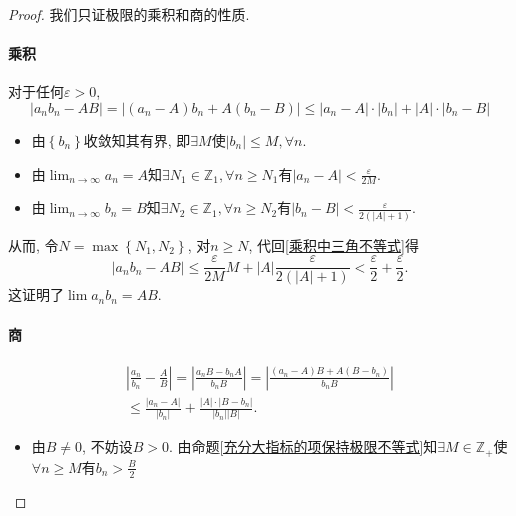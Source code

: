 \begin{proof}
    我们只证极限的乘积和商的性质.
    \paragraph{乘积}
    对于任何$\varepsilon > 0$, 
    \begin{equation}\label{乘积中三角不等式}
      |a_n b_n- AB| = |(a_n -A)b_n + A(b_n - B)| \le  |a_n-A|\cdot|b_n| + |A|\cdot |b_n -B|
    \end{equation}
    \begin{itemize}
      \item 由$\left\{ b_n \right\} $收敛知其有界, 即$\exists M$使$|b_n| \le M, \forall n$.
      
      \item 由$\displaystyle \lim_{n \to \infty}a_n =A$知$\exists N_1 \in \mathbb{Z}_{1}, \forall n\ge N_1$有$|a_n -A| < \frac{\varepsilon}{2M}$.
      
      \item 由$\displaystyle \lim_{n \to \infty}b_n =B$知$\exists N_2 \in \mathbb{Z}_{1}, \forall n\ge N_2$有$|b_n -B| < \frac{\varepsilon}{2(|A|+1)}$.
    \end{itemize}

    从而, 令$N =\max\left\{ N_1,N_2 \right\} $, 对$n\ge N$, 代回\eqref{乘积中三角不等式}得
    \begin{equation}
      |a_n b_n -AB| \le  \frac{\varepsilon}{2M} M + |A| \frac{\varepsilon}{2(|A| + 1)} < \frac{\varepsilon}{2} + \frac{\varepsilon}{2}.
    \end{equation}
    这证明了$\lim a_n b_n = AB$.

    \paragraph{商}
    \begin{gather}\label{商中用到三角不等式}
      \left| \frac{a_n}{b_n} - \frac{A}{B} \right|  = \left| \frac{a_n B - b_n A}{b_n B} \right|  = \left| \frac{(a_n-A)B + A(B -b_n)}{b_nB} \right|
      \\
      \le \frac{|a_n-A|}{|b_n|} + \frac{|A| \cdot |B - b_n|}{|b_n| |B|}.
    \end{gather}

    \begin{itemize}
      \item 由$B\neq 0$, 不妨设$B>0$. 由命题\ref{充分大指标的项保持极限不等式}知$\exists M\in \mathbb{Z}_{+}$使$\forall n \ge M$有$b_n > \frac{B}{2}$
      

\end{itemize}
\end{proof}
